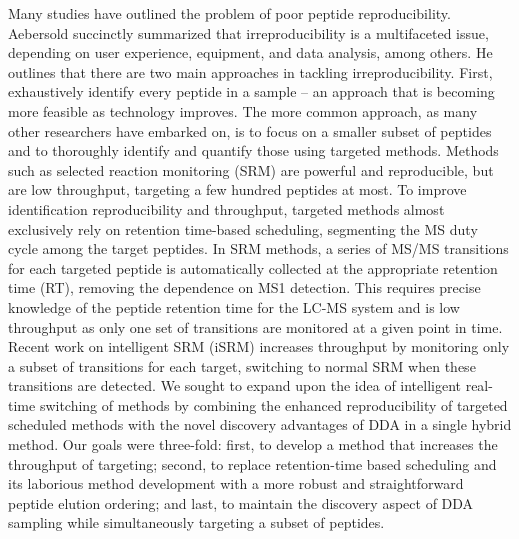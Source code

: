 Many studies have outlined the problem of poor peptide reproducibility.\cite{liu,mrm,tabb,bigtime,pachl} Aebersold succinctly summarized that irreproducibility is a multifaceted issue, depending on user experience, equipment, and data analysis, among others.\cite{aebersold} He outlines that there are two main approaches in tackling irreproducibility. First, exhaustively identify every peptide in a sample -- an approach that is becoming more feasible as technology improves.\cite{thakur,nagaraj,onehour} The more common approach, as many other researchers have embarked on, is to focus on a smaller subset of peptides and to thoroughly identify and quantify those using targeted methods.\cite{savitski} Methods such as selected reaction monitoring (SRM) are powerful and reproducible, but are low throughput, targeting a few hundred peptides at most.\cite{lange,picotti1,picotti2,picotti3,bigsrm} To improve identification reproducibility and throughput, targeted methods almost exclusively rely on retention time-based scheduling, segmenting the MS duty cycle among the target peptides. In SRM methods, a series of MS/MS transitions for each targeted peptide is automatically collected at the appropriate retention time (RT), removing the dependence on MS1 detection. This requires precise knowledge of the peptide retention time for the LC-MS system and is low throughput as only one set of transitions are monitored at a given point in time. Recent work on intelligent SRM (iSRM) increases throughput by monitoring only a subset of transitions for each target, switching to normal SRM when these transitions are detected.\cite{isrm} We sought to expand upon the idea of intelligent real-time switching of methods by combining the enhanced reproducibility of targeted scheduled methods with the novel discovery advantages of DDA in a single hybrid method. Our goals were three-fold: first, to develop a method that increases the throughput of targeting; second, to replace retention-time based scheduling and its laborious method development with a more robust and straightforward peptide elution ordering; and last, to maintain the discovery aspect of DDA sampling while simultaneously targeting a subset of peptides.

